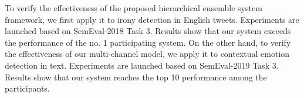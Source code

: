 \begin{eabstract}
\begin{enumerate}
\end{enumerate}

To verify the effectiveness of the proposed hierarchical ensemble system framework, we first apply it to irony detection in English tweets. Experiments are launched based on SemEval-2018 Task 3. Results show that our system exceeds the performance of the no. 1 participating system. On the other hand, to verify the effectiveness of our multi-channel model, we apply it to contextual emotion detection in text. Experiments are launched based on SemEval-2019 Task 3. Results show that our system reaches the top 10 performance among the participants.

\end{eabstract}

